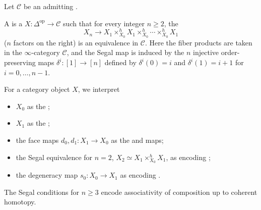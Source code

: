 \begin{definition} \label{definition:category_object_in_an_infty_category}
    Let $\mathcal{C}$ be an  admitting .

    A  is a  $X : \Delta^{\mathrm{op}} \to \mathcal{C}$ such that for every integer $n \ge 2$, the 
    $$X_n \to X_1 \times_{X_0}^h X_1 \times_{X_0}^h \cdots \times_{X_0}^h X_1$$
    ($n$ factors on the right) is an equivalence in $\mathcal{C}$. 
    Here the fiber products are taken in the $\infty$-category $\mathcal{C}$, and the Segal map is induced by the $n$ injective order-preserving maps $\delta^i : [1] \to [n]$ defined by $\delta^i(0) = i$ and $\delta^i(1) = i + 1$ for $i = 0, \dots, n-1$.

    For a category object $X$, we interpret
    \begin{itemize}
        \item $X_0$ as the ;
        \item $X_1$ as the ;
        \item the face maps $d_0, d_1 : X_1 \to X_0$ as the  and  maps;
        \item the Segal equivalence for $n = 2$, $X_2 \simeq X_1 \times_{X_0}^h X_1$, as encoding ;
        \item the degeneracy map $s_0 : X_0 \to X_1$ as encoding .
    \end{itemize}
    The Segal conditions for $n \ge 3$ encode associativity of composition up to coherent homotopy.
\end{definition}
